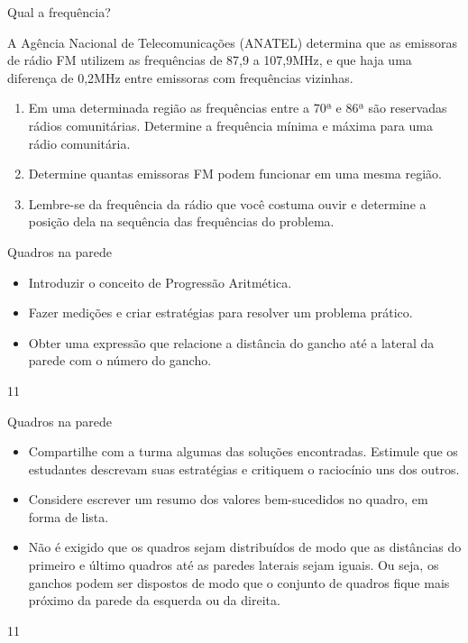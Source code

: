 \clearpage
\begin{task}{Qual a frequência?}
\label{\detokenize{AF107-6:atividade-qual-a-frequencia}}\label{\detokenize{AF107-6:id4}}

A Agência Nacional de Telecomunicações (ANATEL) determina que as emissoras de rádio FM utilizem as frequências de 87,9 a 107,9MHz, e que haja uma diferença de 0,2MHz entre emissoras com frequências vizinhas.
\begin{enumerate}
\item {} 
Em uma determinada região as frequências entre a 70ª e 86ª são reservadas rádios comunitárias. Determine a frequência mínima e máxima para uma rádio comunitária.

\item {} 
Determine quantas emissoras FM podem funcionar em uma mesma região.

\item {} 
Lembre-se da frequência da rádio que você costuma ouvir e determine a posição dela na sequência das frequências do problema.

\end{enumerate}
\end{task}
\clearpage
\def\currentcolor{session1}
\begin{objectives}{Quadros na parede}
{
\begin{itemize}
\item Introduzir o conceito de Progressão Aritmética.
\item  Fazer medições e criar estratégias para resolver um problema prático.
\item  Obter uma expressão que relacione a distância do gancho até a lateral da parede com o número do gancho.

\end{itemize}
}{1}{1}
\end{objectives}
\begin{sugestions}{Quadros na parede}
{
\begin{itemize}
\item Compartilhe com a turma algumas das soluções encontradas. Estimule que os estudantes descrevam suas estratégias e critiquem o raciocínio uns dos outros.
\item  Considere escrever um resumo dos valores bem-sucedidos no quadro, em
forma de lista.
\item  Não é exigido que os quadros sejam distribuídos de modo que as distâncias do primeiro e último quadros até as paredes laterais sejam iguais. Ou seja, os ganchos podem ser dispostos de modo que o conjunto de quadros fique mais próximo da parede da esquerda ou da direita.
\end{itemize}
}{1}{1}
\end{sugestions}
